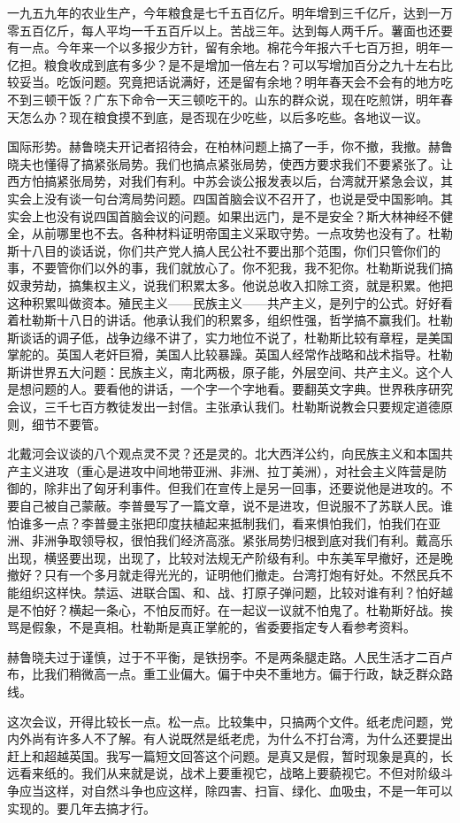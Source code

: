 一九五九年的农业生产，今年粮食是七千五百亿斤。明年增到三千亿斤，达到一万零五百亿斤，每人平均一千五百斤以上。苦战三年。达到每人两千斤。薯面也还要有一点。今年来一个以多报少方针，留有余地。棉花今年报六千七百万担，明年一亿担。粮食收成到底有多少？是不是增加一倍左右？可以写增加百分之九十左右比较妥当。吃饭问题。究竟把话说满好，还是留有余地？明年春天会不会有的地方吃不到三顿干饭？广东下命令一天三顿吃干的。山东的群众说，现在吃煎饼，明年春天怎么办？现在粮食摸不到底，是否现在少吃些，以后多吃些。各地议一议。

国际形势。赫鲁晓夫开记者招待会，在柏林问题上搞了一手，你不撤，我撤。赫鲁晓夫也懂得了搞紧张局势。我们也搞点紧张局势，使西方要求我们不要紧张了。让西方怕搞紧张局势，对我们有利。中苏会谈公报发表以后，台湾就开紧急会议，其实会上没有谈一句台湾局势问题。四国首脑会议不召开了，也说是受中国影响。其实会上也没有说四国首脑会议的问题。如果出远门，是不是安全？斯大林神经不健全，从前哪里也不去。各种材料证明帝国主义采取守势。一点攻势也没有了。杜勒斯十八目的谈话说，你们共产党人搞人民公社不要出那个范围，你们只管你们的事，不要管你们以外的事，我们就放心了。你不犯我，我不犯你。杜勒斯说我们搞奴隶劳劫，搞集权主义，说我们积累太多。他说总收入扣除工资，就是积累。他把这种积累叫做资本。殖民主义——民族主义——共产主义，是列宁的公式。好好看着杜勒斯十八日的讲话。他承认我们的积累多，组织性强，哲学搞不赢我们。杜勒斯谈话的调子低，战争边缘不讲了，实力地位不说了，杜勒斯比较有章程，是美国掌舵的。英国人老奸巨猾，美国人比较暴躁。英国人经常作战略和战术指导。杜勒斯讲世界五大问题：民族主义，南北两极，原子能，外层空间、共产主义。这个人是想问题的人。要看他的讲话，一个字一个字地看。要翻英文字典。世界秩序研究会议，三千七百方教徒发出一封信。主张承认我们。杜勒斯说教会只要规定道德原则，细节不要管。

北戴河会议谈的八个观点灵不灵？还是灵的。北大西洋公约，向民族主义和本国共产主义进攻（重心是进攻中间地带亚洲、非洲、拉丁美洲），对社会主义阵营是防御的，除非出了匈牙利事件。但我们在宣传上是另一回事，还要说他是进攻的。不要自己被自己蒙蔽。李普曼写了一篇文章，说不是进攻，但说服不了苏联人民。谁怕谁多一点？李普曼主张把印度扶植起来抵制我们，看来惧怕我们，怕我们在亚洲、非洲争取领导权，很怕我们经济高涨。紧张局势归根到底对我们有利。戴高乐出现，横竖要出现，出现了，比较对法规无产阶级有利。中东美军早撤好，还是晚撤好？只有一个多月就走得光光的，证明他们撤走。台湾打炮有好处。不然民兵不能组织这样快。禁运、进联合国、和、战、打原子弹问题，比较对谁有利？怕好越是不怕好？横起一条心，不怕反而好。在一起议一议就不怕鬼了。杜勒斯好战。挨骂是假象，不是真相。杜勒斯是真正掌舵的，省委要指定专人看参考资料。

赫鲁晓夫过于谨慎，过于不平衡，是铁拐李。不是两条腿走路。人民生活才二百卢布，比我们稍微高一点。重工业偏大。偏于中央不重地方。偏于行政，缺乏群众路线。

这次会议，开得比较长一点。松一点。比较集中，只搞两个文件。纸老虎问题，党内外尚有许多人不了解。有人说既然是纸老虎，为什么不打台湾，为什么还要提出赶上和超越英国。我写一篇短文回答这个问题。是真又是假，暂时现象是真的，长远看来纸的。我们从来就是说，战术上要重视它，战略上要藐视它。不但对阶级斗争应当这样，对自然斗争也应这样，除四害、扫盲、绿化、血吸虫，不是一年可以实现的。要几年去搞才行。


